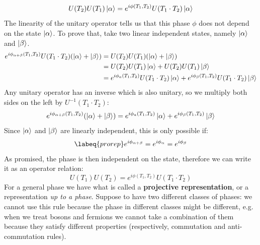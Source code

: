 \documentclass[../main.tex]{subfiles}
\begin{document}
\[
U(T_2)U(T_1)\ket{\alpha}=e^{i\phi(T_1,T_2)}U(T_1\cdot T_2)\ket{\alpha}
\]
The linearity of the unitary operator tells us that this phase $\phi$ does not depend on the state $\ket{\alpha}$. To prove that, take two linear independent states, namely $\ket{\alpha}$ and $\ket{\beta}$.
\begin{align*}
e^{i\phi_{\alpha+\beta}(T_1,T_2)}U(T_1\cdot T_2)(\ket{\alpha}+\ket{\beta})&=U(T_2)U(T_1)(\ket{\alpha}+\ket{\beta})\\
&=U(T_2)U(T_1)\ket{\alpha}+U(T_2)U(T_1)\ket{\beta}\\
&=e^{i\phi_a(T_1,T_2)}U(T_1\cdot T_2)\ket{\alpha}+e^{i\phi_\beta(T_1,T_2)}U(T_1\cdot T_2)\ket{\beta}
\end{align*}
Any unitary operator has an inverse which is also unitary, so we multiply both sides on the left by $U^{-1}(T_1\cdot T_2)$:
\[
e^{i\phi_{\alpha+\beta}(T_1,T_2)}(\ket{\alpha}+\ket{\beta})=e^{i\phi_a(T_1,T_2)}\ket{\alpha}+e^{i\phi_\beta(T_1,T_2)}\ket{\beta}
\]
Since $\ket{\alpha}$ and $\ket{\beta}$ are linearly independent, this is only possible if:
\begin{equation}
\labeq{prorep}
e^{i\phi_{\alpha+\beta}}=e^{i\phi_\alpha}=e^{i\phi_\beta}
\end{equation}
As promised, the phase is then independent on the state, therefore we can write it as an operator relation:
\[
U(T_1)U(T_2)=e^{i\phi(T_1,T_2)}U(T_1\cdot T_2)
\]
For a general phase we have what is called a \textbf{projective representation}, or a representation \textit{up to a phase}. Suppose to have two different classes of phases: we cannot use this rule because the phase in different classes might be different, e.g. when we treat bosons and fermions we cannot take a combination of them because they satisfy different properties (respectively, commutation and anti-commutation rules).
\end{document}
